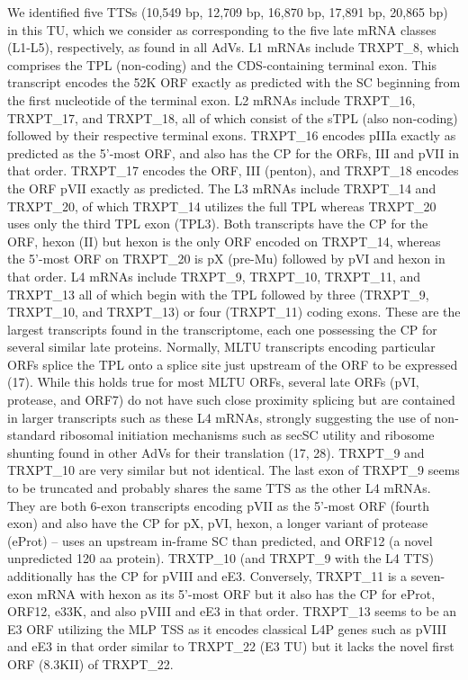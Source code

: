 \documentclass[
]{article}
\begin{document}
We identified five TTSs (10,549 bp, 12,709 bp, 16,870 bp, 17,891 bp,
20,865 bp) in this TU, which we consider as corresponding to the five
late mRNA classes (L1-L5), respectively, as found in all AdVs. L1 mRNAs
include TRXPT\_8, which comprises the TPL (non-coding) and the
CDS-containing terminal exon. This transcript encodes the 52K ORF
exactly as predicted with the SC beginning from the first nucleotide of
the terminal exon. L2 mRNAs include TRXPT\_16, TRXPT\_17, and TRXPT\_18,
all of which consist of the sTPL (also non-coding) followed by their
respective terminal exons. TRXPT\_16 encodes pIIIa exactly as predicted
as the 5'-most ORF, and also has the CP for the ORFs, III and pVII in
that order. TRXPT\_17 encodes the ORF, III (penton), and TRXPT\_18
encodes the ORF pVII exactly as predicted. The L3 mRNAs include
TRXPT\_14 and TRXPT\_20, of which TRXPT\_14 utilizes the full TPL
whereas TRXPT\_20 uses only the third TPL exon (TPL3). Both transcripts
have the CP for the ORF, hexon (II) but hexon is the only ORF encoded on
TRXPT\_14, whereas the 5'-most ORF on TRXPT\_20 is pX (pre-Mu) followed
by pVI and hexon in that order. L4 mRNAs include TRXPT\_9, TRXPT\_10,
TRXPT\_11, and TRXPT\_13 all of which begin with the TPL followed by
three (TRXPT\_9, TRXPT\_10, and TRXPT\_13) or four (TRXPT\_11) coding
exons. These are the largest transcripts found in the transcriptome,
each one possessing the CP for several similar late proteins. Normally,
MLTU transcripts encoding particular ORFs splice the TPL onto a splice
site just upstream of the ORF to be expressed (17). While this holds
true for most MLTU ORFs, several late ORFs (pVI, protease, and ORF7) do
not have such close proximity splicing but are contained in larger
transcripts such as these L4 mRNAs, strongly suggesting the use of
non-standard ribosomal initiation mechanisms such as secSC utility and
ribosome shunting found in other AdVs for their translation (17, 28).
TRXPT\_9 and TRXPT\_10 are very similar but not identical. The last exon
of TRXPT\_9 seems to be truncated and probably shares the same TTS as
the other L4 mRNAs. They are both 6-exon transcripts encoding pVII as
the 5'-most ORF (fourth exon) and also have the CP for pX, pVI, hexon, a
longer variant of protease (eProt) -- uses an upstream in-frame SC than
predicted, and ORF12 (a novel unpredicted 120 aa protein). TRXTP\_10
(and TRXPT\_9 with the L4 TTS) additionally has the CP for pVIII and
eE3. Conversely, TRXPT\_11 is a seven-exon mRNA with hexon as its
5'-most ORF but it also has the CP for eProt, ORF12, e33K, and also
pVIII and eE3 in that order. TRXPT\_13 seems to be an E3 ORF utilizing
the MLP TSS as it encodes classical L4P genes such as pVIII and eE3 in
that order similar to TRXPT\_22 (E3 TU) but it lacks the novel first ORF
(8.3KII) of TRXPT\_22.
\end{document}
